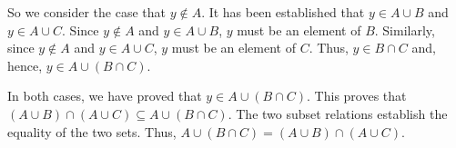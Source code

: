\begin{myproof}
So we consider the case that $y \notin A$.  It has been established that  $y \in A \cup B$ and $y \in A \cup C$.  Since  $y \notin A$  and  $y \in A \cup B$,  $y$  must be an element of  $B$.  Similarly, since  $y \notin A$  and  $y \in A \cup C$,  $y$  must be an element of  $C$.  Thus,  $y \in B \cap C$  and, hence,  $y \in A \cup \left( {B \cap C} \right)$.


In both cases, we have proved that $y \in A \cup \left( {B \cap C} \right)$.  This proves that 
$\left( {A \cup B} \right) \cap \left( {A \cup C} \right) \subseteq A \cup \left( {B \cap C} \right)$.  The two subset relations establish the equality of the two sets.  Thus, 
 $A \cup \left( {B \cap C} \right) = \left( {A \cup B} \right) \cap \left( {A \cup C} \right)$.
\end{myproof}
\hbreak



\endinput
